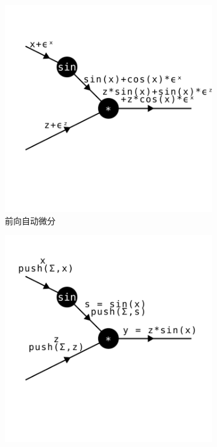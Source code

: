 \documentclass[A4,twoside,fontset=ubuntu,UTF8]{ctexart}
\begin{document}
    \begin{figure}[t]
\centering
\begin{subfigure}[b]{0.32\textwidth}
    \centering
    \includegraphics[width=\textwidth, trim={1cm 0 0cm 0}, clip]{./forwarddiff.pdf}
    \caption{前向自动微分}
\end{subfigure}
\begin{subfigure}[b]{0.32\textwidth}
    \centering
    \includegraphics[width=\textwidth, trim={0 0 1cm 0}, clip]{./backward-forward.pdf}

\end{subfigure}
\end{figure}
\end{document}
